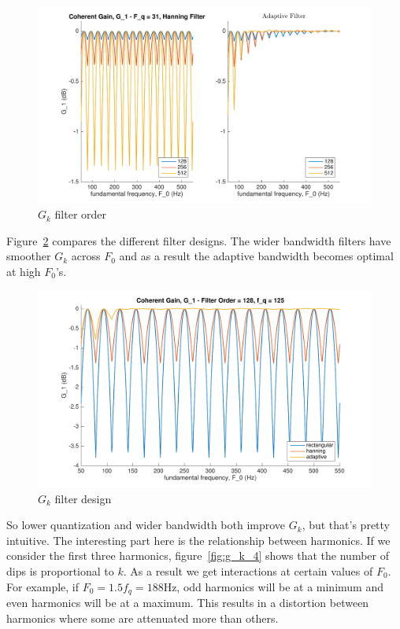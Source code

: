 \documentclass [11pt, proquest,oneside] {ganter_thesis}[2015/03/03]
\begin{document}
\begin{figure}[!ht]
  \centering
    \includegraphics[width=1\textwidth]{g_k_2}   
    \caption{$G_k$ filter order}\label{fig:g_k_2}
\end{figure}

Figure~\ref{fig:g_k_3} compares the different filter designs.  The wider bandwidth filters have smoother $G_k$ across $F_0$ and as a result the adaptive bandwidth becomes optimal at high $F_0$'s.

\begin{figure}[!ht]
  \centering
    \includegraphics[width=1\textwidth]{g_k_3}   
    \caption{$G_k$ filter design}\label{fig:g_k_3}
\end{figure}

So lower quantization and wider bandwidth both improve $G_k$, but that's pretty intuitive.  The interesting part here is the relationship between harmonics.  If we consider the first three harmonics, figure~\ref{fig:g_k_4} shows that the number of dips is proportional to $k$.  As a result we get interactions at certain values of $F_0$.  For example, if $F_0 = 1.5f_q = 188$Hz, odd harmonics will be at a minimum and even harmonics will be at a maximum.  This results in a distortion between harmonics where some are attenuated more than others.
\end{document}
